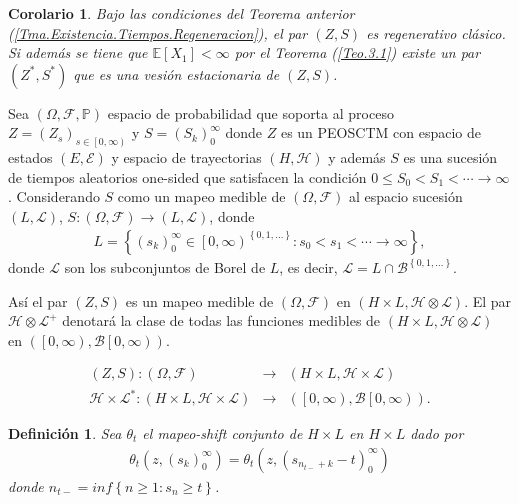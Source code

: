 \documentclass{article}
\newtheorem{Def}{Definición}[section]
\newtheorem{Cor}{Corolario}[section]
\newcommand{\esp}{\mathbb{E}}
\newcommand{\prob}{\mathbb{P}}
\numberwithin{equation}{section}
\begin{document}
\begin{Cor}\label{Tma.Estacionariedad}
Bajo las condiciones del Teorema anterior (\ref{Tma.Existencia.Tiempos.Regeneracion}), el par $\left(Z,S\right)$ es regenerativo cl\'asico. Si adem\'as se tiene que $\esp\left[X_{1}\right]<\infty$ por el Teorema (\ref{Teo.3.1}) existe un par $\left(Z^{*},S^{*}\right)$ que es una vesi\'on estacionaria de $\left(Z,S\right)$.
\end{Cor}

Sea $\left(\Omega,\mathcal{F},\prob\right)$ espacio de probabilidad que soporta al proceso $Z=\left(Z_{s}\right)_{s\in\left[0,\infty\right)}$ y $S=\left(S_{k}\right)_{0}^{\infty}$ donde $Z$ es un PEOSCTM con espacio de estados $\left(E,\mathcal{E}\right)$  y espacio de trayectorias $\left(H,\mathcal{H}\right)$  y adem\'as $S$ es una sucesi\'on de tiempos aleatorios one-sided que satisfacen la condici\'on $0\leq S_{0}<S_{1}<\cdots\rightarrow\infty$. Considerando $S$ como un mapeo medible de $\left(\Omega,\mathcal{F}\right)$ al espacio sucesi\'on $\left(L,\mathcal{L}\right)$, $S:\left(\Omega,\mathcal{F}\right)\rightarrow\left(L,\mathcal{L}\right)$, donde 
\begin{eqnarray*}
L=\left\{\left(s_{k}\right)_{0}^{\infty}\in\left[0,\infty\right)^{\left\{0,1,\ldots\right\}}:s_{0}<s_{1}<\cdots\rightarrow\infty\right\},
\end{eqnarray*}
donde $\mathcal{L}$ son los subconjuntos de Borel de $L$, es decir, $\mathcal{L}=L\cap\mathcal{B}^{\left\{0,1,\ldots\right\}}$.

As\'i el par $\left(Z,S\right)$ es un mapeo medible de  $\left(\Omega,\mathcal{F}\right)$ en $\left(H\times L,\mathcal{H}\otimes\mathcal{L}\right)$. El par $\mathcal{H}\otimes\mathcal{L}^{+}$ denotar\'a la clase de todas las funciones medibles de $\left(H\times L,\mathcal{H}\otimes\mathcal{L}\right)$ en $\left(\left[0,\infty\right),\mathcal{B}\left[0,\infty\right)\right)$.

\begin{eqnarray*}
\left(Z,S\right):\left(\Omega,\mathcal{F}\right)&\rightarrow& \left(H\times L,\mathcal{H}\times\mathcal{L}\right)\\
\mathcal{H}\times\mathcal{L}^{*}:\left(H\times L,\mathcal{H}\times\mathcal{L}\right)
&\rightarrow& 
\left(\left[0,\infty\right),\mathcal{B}\left[0,\infty\right)\right).
\end{eqnarray*}

\begin{Def}
Sea $\theta_{t}$ el mapeo-shift conjunto de $H\times L$ en $H\times L$ dado por
\begin{eqnarray*}
\theta_{t}\left(z,\left(s_{k}\right)_{0}^{\infty}\right)=\theta_{t}\left(z,\left(s_{n_{t-}+k}-t\right)_{0}^{\infty}\right)
\end{eqnarray*}
donde 
$n_{t-}=inf\left\{n\geq1:s_{n}\geq t\right\}$.
\end{Def}
\end{document}

